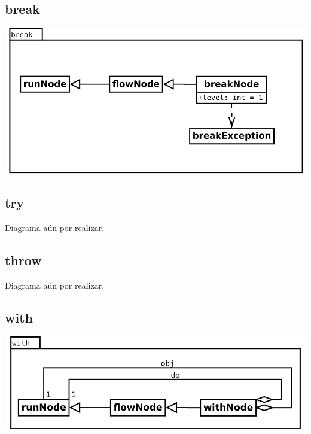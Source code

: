 \subsection{break}
\begin{center}
\includegraphics[scale=0.4]{break.png} \\
\end{center}

\subsection{try}
Diagrama aún por realizar.

\subsection{throw}
Diagrama aún por realizar.


\subsection{with}
\begin{center}
\includegraphics[scale=0.4]{with.png} \\
\end{center}
\pagebreak
